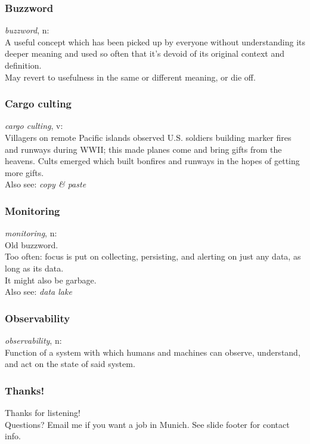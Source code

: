 \documentclass[aspectratio=169]{beamer}
\begin{document}
\begin{frame}
	\frametitle{Buzzword}
	\begin{center}
		\vfill
		\textit{buzzword}, n:\\
		A useful concept which has been picked up by everyone without understanding its deeper meaning and used so often that it's devoid of its original context and definition.\\
		May revert to usefulness in the same or different meaning, or die off.
		\vfill
	\end{center}
\end{frame}

\begin{frame}
	\frametitle{Cargo culting}
	\begin{center}
		\vfill
		\textit{cargo culting}, v:\\
		Villagers on remote Pacific islands observed U.S. soldiers building marker fires and runways during WWII; this made planes come and bring gifts from the heavens.
		Cults emerged which built bonfires and runways in the hopes of getting more gifts.\\
		Also see: \textit{copy \& paste}
		\vfill
	\end{center}
\end{frame}

\begin{frame}
	\frametitle{Monitoring}
	\begin{center}
		\vfill
		\textit{monitoring}, n:\\
		Old buzzword.\\
		Too often: focus is put on collecting, persisting, and alerting on just any data, as long as its data.\\
		It might also be garbage.\\
		Also see: \textit{data lake}
		\vfill
	\end{center}
\end{frame}

\begin{frame}
	\frametitle{Observability}
	\begin{center}
		\vfill
		\textit{observability}, n:\\
		Function of a system with which humans and machines can observe, understand, and act on the state of said system.
		\vfill
	\end{center}
\end{frame}

\begin{frame}
	\frametitle{Thanks!}
	\begin{center}
		\vfill
		Thanks for listening!\\
		\vfill
		Questions?
		\vfill
		Email me if you want a job in Munich.
		\vfill
		See slide footer for contact info.
		\vfill
	\end{center}
\end{frame}
\end{document}
